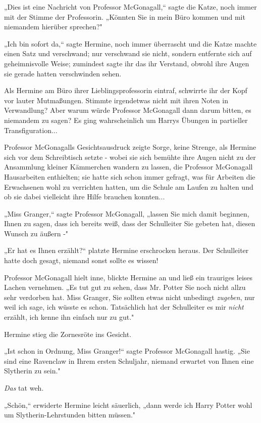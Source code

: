 {„Dies ist eine Nachricht von Professor McGonagall,“ sagte die Katze, noch immer mit der Stimme der Professorin. „Könnten Sie in mein Büro kommen und mit niemandem hierüber sprechen?"

„Ich bin sofort da,“ sagte Hermine, noch immer überrascht und die Katze machte einen Satz und verschwand; nur verschwand sie nicht, sondern entfernte sich auf geheimnisvolle Weise; zumindest sagte ihr das ihr Verstand, obwohl ihre Augen sie gerade hatten verschwinden sehen.

Als Hermine am Büro ihrer Lieblingsprofessorin eintraf, schwirrte ihr der Kopf vor lauter Mutmaßungen. Stimmte irgendetwas nicht mit ihren Noten in Verwandlung? Aber warum würde Professor McGonagall dann darum bitten, es niemandem zu sagen? Es ging wahrscheinlich um Harrys Übungen in partieller Transfiguration...

Professor McGonagalls Gesichtsausdruck zeigte Sorge, keine Strenge, als Hermine sich vor dem Schreibtisch setzte - wobei sie sich bemühte ihre Augen nicht zu der Ansammlung kleiner Kämmerchen wandern zu lassen, die Professor McGonagall Hausarbeiten enthielten; sie hatte sich schon immer gefragt, was für Arbeiten die Erwachsenen wohl zu verrichten hatten, um die Schule am Laufen zu halten und ob sie dabei vielleicht ihre Hilfe brauchen konnten...

„Miss Granger,“ sagte Professor McGonagall, „lassen Sie mich damit beginnen, Ihnen zu sagen, dass ich bereits weiß, dass der Schulleiter Sie gebeten hat, diesen Wunsch zu äußern -"

„Er hat es Ihnen erzählt?“ platzte Hermine erschrocken heraus. Der Schulleiter hatte doch gesagt, niemand sonst sollte es wissen!

Professor McGonagall hielt inne, blickte Hermine an und ließ ein trauriges leises Lachen vernehmen. „Es tut gut zu sehen, dass Mr. Potter Sie noch nicht allzu sehr verdorben hat. Miss Granger, Sie sollten etwas nicht unbedingt \emph{zugeben}, nur weil ich sage, ich wüsste es schon. Tatsächlich hat der Schulleiter es mir \emph{nicht} erzählt, ich kenne ihn einfach nur zu gut."

Hermine stieg die Zornesröte ins Gesicht.

„Ist schon in Ordnung, Miss Granger!“ sagte Professor McGonagall hastig. „Sie sind eine Ravenclaw in Ihrem ersten Schuljahr, niemand erwartet von Ihnen eine Slytherin zu sein."

\emph{Das} tat weh.

„Schön,“ erwiderte Hermine leicht säuerlich, „dann werde ich Harry Potter wohl um Slytherin-Lehrstunden bitten müssen."

}
